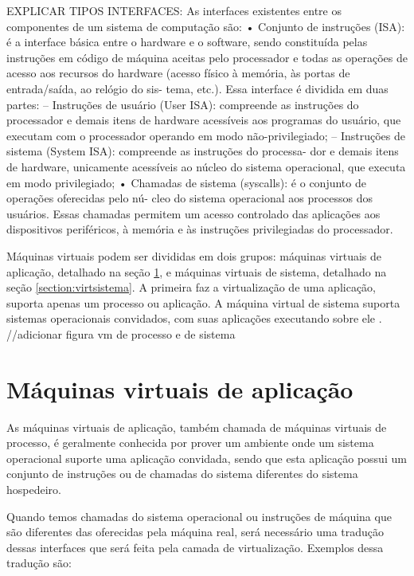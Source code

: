 EXPLICAR TIPOS INTERFACES:
As interfaces existentes entre os componentes de um sistema de computação são:
• Conjunto de instruções (\ac{ISA}): é a interface básica
entre o hardware e o software, sendo constituída pelas instruções em código de
máquina aceitas pelo processador e todas as operações de acesso aos recursos do
hardware (acesso físico à memória, às portas de entrada/saída, ao relógio do sis-
tema, etc.). Essa interface é dividida em duas partes:
– Instruções de usuário (User ISA): compreende as instruções do processador e
demais itens de hardware acessíveis aos programas do usuário, que executam
com o processador operando em modo não-privilegiado;
– Instruções de sistema (System ISA): compreende as instruções do processa-
dor e demais itens de hardware, unicamente acessíveis ao núcleo do sistema
operacional, que executa em modo privilegiado;
• Chamadas de sistema (syscalls): é o conjunto de operações oferecidas pelo nú-
cleo do sistema operacional aos processos dos usuários. Essas chamadas permitem
um acesso controlado das aplicações aos dispositivos periféricos, à memória e às
instruções privilegiadas do processador.


Máquinas virtuais podem ser divididas em dois grupos: máquinas virtuais de aplicação, detalhado na seção \ref{section:virtaplicacao}, e 
máquinas virtuais de sistema, detalhado na seção \ref{section:virtsistema}. A primeira faz a
virtualização de uma aplicação, suporta apenas um processo ou aplicação. 
A máquina virtual de sistema suporta sistemas operacionais convidados, com suas aplicações executando sobre ele \cite{laureano2008}.
//adicionar figura vm de processo e de sistema

\section{Máquinas virtuais de aplicação}
\label{section:virtaplicacao}
As máquinas virtuais de aplicação, também chamada de máquinas virtuais de processo, é geralmente conhecida por prover um ambiente
onde um sistema operacional suporte uma aplicação convidada, sendo que esta aplicação possui um conjunto de instruções ou de chamadas
do sistema diferentes do sistema hospedeiro.

Quando temos chamadas do sistema operacional ou instruções de máquina que são diferentes das oferecidas pela máquina real, será necessário
uma tradução dessas interfaces que será feita pela camada de virtualização. Exemplos dessa tradução são:

